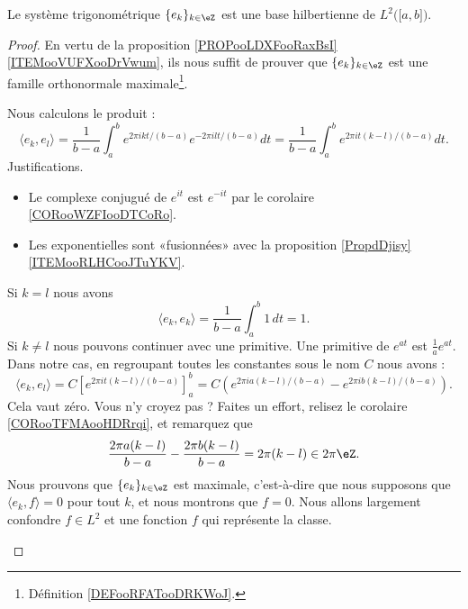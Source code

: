 \begin{theorem}       \label{THOooAVWIooDhnjpN}
	Le système trigonométrique \( \{ e_k \}_{k\in \eZ}\) est une base hilbertienne de \( L^2\big( \mathopen[ a , b \mathclose] \big)\).
\end{theorem}

\begin{proof}
	En vertu de la proposition \ref{PROPooLDXFooRaxBsI}\ref{ITEMooVUFXooDrVwum}, ils nous suffit de prouver que \( \{ e_k \}_{k\in \eZ}\) est une famille orthonormale maximale\footnote{Définition \ref{DEFooRFATooDRKWoJ}.}.

	\begin{subproof}
		\spitem[Orthonormale]
		Nous calculons le produit :
		\begin{equation}
			\langle e_k, e_l\rangle =\frac{1}{ b-a }\int_a^b e^{2\pi i kt/(b-a)} e^{-2\pi i lt/(b-a)}dt
			=\frac{1}{ b-a }\int_a^b e^{2\pi i t(k-l)/(b-a)}dt.
		\end{equation}
		Justifications.
		\begin{itemize}
			\item
			      Le complexe conjugué de \(  e^{it}\) est \(  e^{-it}\) par le corolaire \ref{CORooWZFIooDTCoRo}.
			\item
			      Les exponentielles sont «fusionnées» avec la proposition \ref{PropdDjisy}\ref{ITEMooRLHCooJTuYKV}.
		\end{itemize}
		Si \( k=l\) nous avons
		\begin{equation}
			\langle e_k, e_k\rangle =\frac{1}{ b-a }\int_a^b1\,dt=1.
		\end{equation}
		Si \( k\neq l\) nous pouvons continuer avec une primitive. Une primitive de \(  e^{at}\) est \( \frac{1}{ a } e^{at}\). Dans notre cas, en regroupant toutes les constantes sous le nom \( C\) nous avons :
		\begin{equation}
			\langle e_k, e_l\rangle =C\left[   e^{2\pi it(k-l)/(b-a)} \right]_a^b=C\left(  e^{2\pi i a(k-l)/(b-a)}- e^{2\pi i b(k-l)/(b-a)} \right).
		\end{equation}
		Cela vaut zéro. Vous n'y croyez pas ? Faites un effort, relisez le corolaire \ref{CORooTFMAooHDRrqi}, et remarquez que
		\begin{equation}
			\frac{ 2\pi a(k-l) }{ b-a }-\frac{ 2\pi b(k-l) }{ b-a }=2\pi (k-l)\in 2\pi \eZ.
		\end{equation}
		\spitem[Maximale]
		Nous prouvons que \( \{ e_k \}_{k\in \eZ}\) est maximale, c'est-à-dire que nous supposons que \( \langle e_k, f\rangle =0\) pour tout \( k\), et nous montrons que \( f=0\). Nous allons largement confondre \( f\in L^2\) et une fonction \( f\) qui représente la classe.


\end{subproof}
\end{proof}
